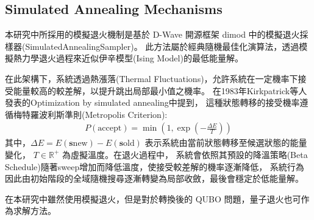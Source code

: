 \subsection{Simulated Annealing Mechanisms}
本研究中所採用的模擬退火機制是基於 D-Wave 開源框架 dimod 中的模擬退火採樣器(SimulatedAnnealingSampler)。
此方法屬於經典隨機最佳化演算法，透過模擬熱力學退火過程來近似伊辛模型(Ising Model)的最低能量解。

在此架構下，系統透過熱漲落(Thermal Fluctuations)，允許系統在一定機率下接受能量較高的較差解，以提升跳出局部最小值之機率。
在1983年Kirkpatrick等人發表的Optimization by simulated annealing\cite{kirkpatrick1983_simulated_annealing}中提到，
這種狀態轉移的接受機率遵循梅特羅波利斯準則(Metropolis Criterion):
\begin{align}
P(\text{accept}) = \min \left( 1, \exp\left( -\frac{\Delta E}{T} \right) \right)
\label{eq:metropolis}
\end{align}
其中，$\Delta E = E(\mathbf{s}{\text{new}}) - E(\mathbf{s}{\text{old}})$ 表示系統由當前狀態轉移至候選狀態的能量變化，
$T \in \mathbb{R}^+$ 為虛擬溫度。在退火過程中，
系統會依照其預設的降溫策略(Beta Schedule)隨著sweep增加而降低溫度，使接受較差解的機率逐漸降低，
系統行為因此由初始階段的全域隨機搜尋逐漸轉變為局部收斂，最後會穩定於低能量解。

在本研究中雖然使用模擬退火，但是對於轉換後的 QUBO 問題，量子退火也可作為求解方法。